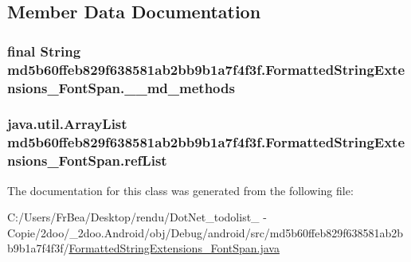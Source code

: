 \subsection{Member Data Documentation}
\hypertarget{classmd5b60ffeb829f638581ab2bb9b1a7f4f3f_1_1_formatted_string_extensions___font_span_9dd575283d39b7b83571ef7dbbde9f63}{
\subsubsection[{\_\-\_\-md\_\-methods}]{\setlength{\rightskip}{0pt plus 5cm}final String {\bf md5b60ffeb829f638581ab2bb9b1a7f4f3f.FormattedStringExtensions\_\-FontSpan.\_\-\_\-md\_\-methods}}}
\label{classmd5b60ffeb829f638581ab2bb9b1a7f4f3f_1_1_formatted_string_extensions___font_span_9dd575283d39b7b83571ef7dbbde9f63}


\hypertarget{classmd5b60ffeb829f638581ab2bb9b1a7f4f3f_1_1_formatted_string_extensions___font_span_a9f3fdfef1b14e27e24108ef098a9091}{
\subsubsection[{refList}]{\setlength{\rightskip}{0pt plus 5cm}java.util.ArrayList {\bf md5b60ffeb829f638581ab2bb9b1a7f4f3f.FormattedStringExtensions\_\-FontSpan.refList}}}
\label{classmd5b60ffeb829f638581ab2bb9b1a7f4f3f_1_1_formatted_string_extensions___font_span_a9f3fdfef1b14e27e24108ef098a9091}




The documentation for this class was generated from the following file:\begin{CompactItemize}
\item 
C:/Users/FrBea/Desktop/rendu/DotNet\_\-todolist\_ - Copie/2doo/\_\-2doo.Android/obj/Debug/android/src/md5b60ffeb829f638581ab2bb9b1a7f4f3f/\hyperlink{_formatted_string_extensions___font_span_8java}{FormattedStringExtensions\_\-FontSpan.java}\end{CompactItemize}

